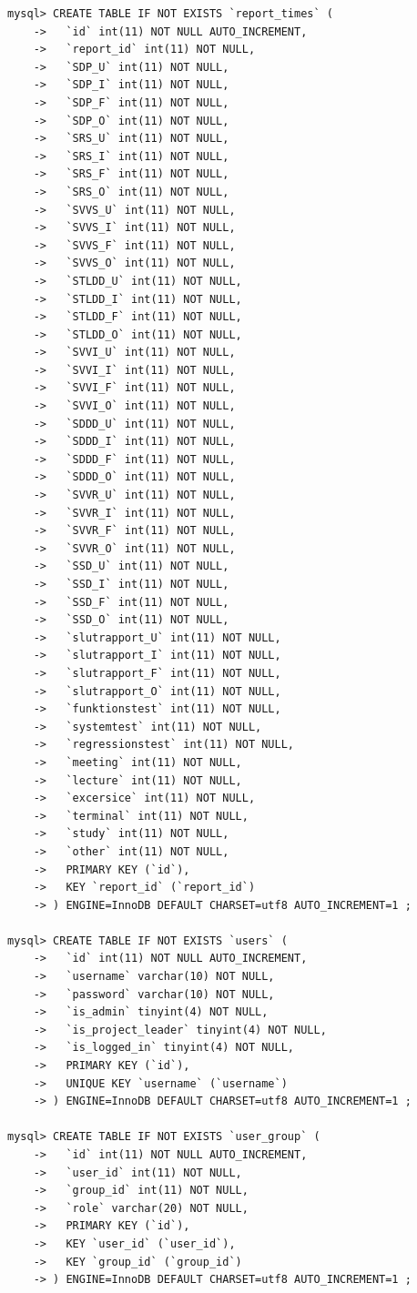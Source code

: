 \documentclass[a4paper]{article}
\begin{document}
\begin{lstlisting}
mysql> CREATE TABLE IF NOT EXISTS `report_times` (
    ->   `id` int(11) NOT NULL AUTO_INCREMENT,
    ->   `report_id` int(11) NOT NULL,
    ->   `SDP_U` int(11) NOT NULL,
    ->   `SDP_I` int(11) NOT NULL,
    ->   `SDP_F` int(11) NOT NULL,
    ->   `SDP_O` int(11) NOT NULL,
    ->   `SRS_U` int(11) NOT NULL,
    ->   `SRS_I` int(11) NOT NULL,
    ->   `SRS_F` int(11) NOT NULL,
    ->   `SRS_O` int(11) NOT NULL,
    ->   `SVVS_U` int(11) NOT NULL,
    ->   `SVVS_I` int(11) NOT NULL,
    ->   `SVVS_F` int(11) NOT NULL,
    ->   `SVVS_O` int(11) NOT NULL,
    ->   `STLDD_U` int(11) NOT NULL,
    ->   `STLDD_I` int(11) NOT NULL,
    ->   `STLDD_F` int(11) NOT NULL,
    ->   `STLDD_O` int(11) NOT NULL,
    ->   `SVVI_U` int(11) NOT NULL,
    ->   `SVVI_I` int(11) NOT NULL,
    ->   `SVVI_F` int(11) NOT NULL,
    ->   `SVVI_O` int(11) NOT NULL,
    ->   `SDDD_U` int(11) NOT NULL,
    ->   `SDDD_I` int(11) NOT NULL,
    ->   `SDDD_F` int(11) NOT NULL,
    ->   `SDDD_O` int(11) NOT NULL,
    ->   `SVVR_U` int(11) NOT NULL,
    ->   `SVVR_I` int(11) NOT NULL,
    ->   `SVVR_F` int(11) NOT NULL,
    ->   `SVVR_O` int(11) NOT NULL,
    ->   `SSD_U` int(11) NOT NULL,
    ->   `SSD_I` int(11) NOT NULL,
    ->   `SSD_F` int(11) NOT NULL,
    ->   `SSD_O` int(11) NOT NULL,
    ->   `slutrapport_U` int(11) NOT NULL,
    ->   `slutrapport_I` int(11) NOT NULL,
    ->   `slutrapport_F` int(11) NOT NULL,
    ->   `slutrapport_O` int(11) NOT NULL,
    ->   `funktionstest` int(11) NOT NULL,
    ->   `systemtest` int(11) NOT NULL,
    ->   `regressionstest` int(11) NOT NULL,
    ->   `meeting` int(11) NOT NULL,
    ->   `lecture` int(11) NOT NULL,
    ->   `excersice` int(11) NOT NULL,
    ->   `terminal` int(11) NOT NULL,
    ->   `study` int(11) NOT NULL,
    ->   `other` int(11) NOT NULL,
    ->   PRIMARY KEY (`id`),
    ->   KEY `report_id` (`report_id`)
    -> ) ENGINE=InnoDB DEFAULT CHARSET=utf8 AUTO_INCREMENT=1 ;

mysql> CREATE TABLE IF NOT EXISTS `users` (
    ->   `id` int(11) NOT NULL AUTO_INCREMENT,
    ->   `username` varchar(10) NOT NULL,
    ->   `password` varchar(10) NOT NULL,
    ->   `is_admin` tinyint(4) NOT NULL,
    ->   `is_project_leader` tinyint(4) NOT NULL,
    ->   `is_logged_in` tinyint(4) NOT NULL,
    ->   PRIMARY KEY (`id`),
    ->   UNIQUE KEY `username` (`username`)
    -> ) ENGINE=InnoDB DEFAULT CHARSET=utf8 AUTO_INCREMENT=1 ;
    
mysql> CREATE TABLE IF NOT EXISTS `user_group` (
    ->   `id` int(11) NOT NULL AUTO_INCREMENT,
    ->   `user_id` int(11) NOT NULL,
    ->   `group_id` int(11) NOT NULL,
    ->   `role` varchar(20) NOT NULL,
    ->   PRIMARY KEY (`id`),
    ->   KEY `user_id` (`user_id`),
    ->   KEY `group_id` (`group_id`)
    -> ) ENGINE=InnoDB DEFAULT CHARSET=utf8 AUTO_INCREMENT=1 ;
    

\end{lstlisting}
\end{document}
